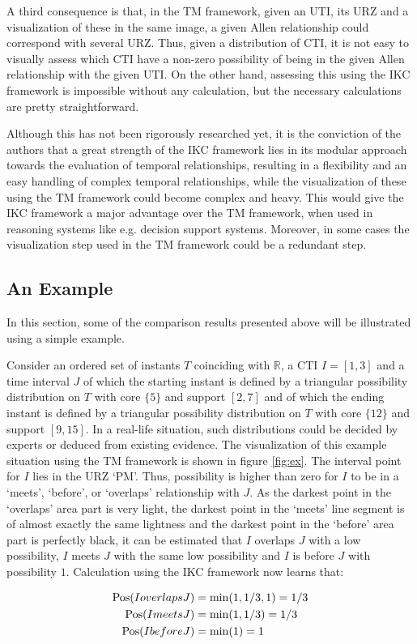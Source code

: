 A third consequence is that, in the TM framework, given an UTI, its URZ and a visualization of these in the same image, a given Allen relationship could correspond with several URZ. Thus, given a distribution of CTI, it is not easy to visually assess which CTI have a non-zero possibility of being in the given Allen relationship with the given UTI. On the other hand, assessing this using the IKC framework is impossible without any calculation, but the necessary calculations are pretty straightforward.

Although this has not been rigorously researched yet, it is the conviction of the authors that a great strength of the IKC framework lies in its modular approach towards the evaluation of temporal relationships, resulting in a flexibility and an easy handling of complex temporal relationships, while the visualization of these using the TM framework could become complex and heavy. This would give the IKC framework a major advantage over the TM framework, when used in reasoning systems like e.g. decision support systems. Moreover, in some cases the visualization step used in the TM framework could be a redundant step.

\subsection{\label{subsec:example}An Example}
In this section, some of the comparison results presented above will be illustrated using a simple example.

\begin{example}
Consider an ordered set of instants $T$ coinciding with $\mathbb{R}$, a CTI $I = \left[1, 3\right]$ and a time interval $J$ of which the starting instant is defined by a triangular possibility distribution on $T$ with core $\{5\}$ and support $\left[2, 7\right]$ and of which the ending instant is defined by a triangular possibility distribution on $T$ with core $\{12\}$ and support $\left[9, 15\right]$. In a real-life situation, such distributions could be decided by experts or deduced from existing evidence. The visualization of this example situation using the TM framework is shown in figure \ref{fig:ex}. The interval point for $I$ lies in the URZ `PM'. Thus, possibility is higher than zero for $I$ to be in a `meets', `before', or `overlaps' relationship with $J$. As the darkest point in the `overlaps' area part is very light, the darkest point in the `meets' line segment is of almost exactly the same lightness and the darkest point in the `before' area part is perfectly black, it can be estimated that $I$ overlaps $J$ with a low possibility, $I$ meets $J$ with the same low possibility and $I$ is before $J$ with possibility $1$. Calculation using the IKC framework now learns that:

\begin{align}
\operatorname{Pos}(I overlaps J) & = \min(1, 1/3, 1) = 1/3 \nonumber \\
\operatorname{Pos}(I meets J) & = \min(1, 1/3) = 1/3\nonumber \\
\operatorname{Pos}(I before J) & = \min(1) = 1\nonumber
\end{align}

\end{example}

